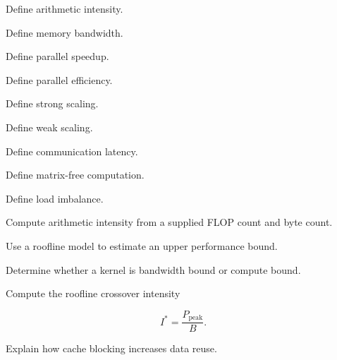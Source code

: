 \begin{exercise}[1]
Define arithmetic intensity.
\end{exercise}

\begin{exercise}[1]
Define memory bandwidth.
\end{exercise}

\begin{exercise}[1]
Define parallel speedup.
\end{exercise}

\begin{exercise}[1]
Define parallel efficiency.
\end{exercise}

\begin{exercise}[1]
Define strong scaling.
\end{exercise}

\begin{exercise}[1]
Define weak scaling.
\end{exercise}

\begin{exercise}[1]
Define communication latency.
\end{exercise}

\begin{exercise}[1]
Define matrix-free computation.
\end{exercise}

\begin{exercise}[1]
Define load imbalance.
\end{exercise}

\begin{exercise}[2]
Compute arithmetic intensity from a supplied FLOP count and byte count.
\end{exercise}

\begin{exercise}[2]
Use a roofline model to estimate an upper performance bound.
\end{exercise}

\begin{exercise}[2]
Determine whether a kernel is bandwidth bound or compute bound.
\end{exercise}

\begin{exercise}[3]
Compute the roofline crossover intensity

\[
I^*
=
\frac{
P_{\mathrm{peak}}
}{
B
}.
\]
\end{exercise}

\begin{exercise}[3]
Explain how cache blocking increases data reuse.
\end{exercise}

